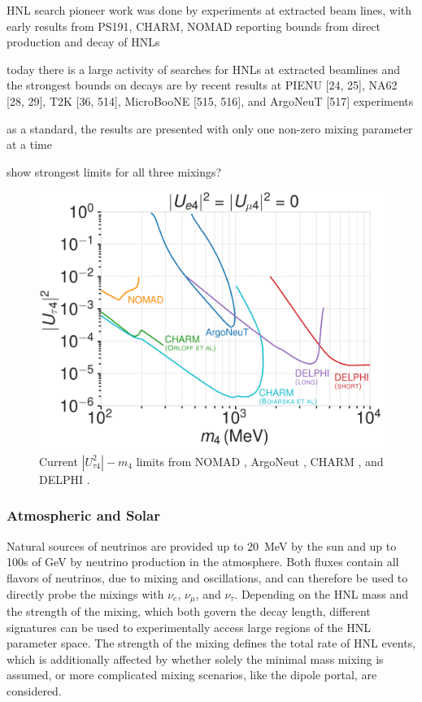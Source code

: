 HNL search pioneer work was done by experiments at extracted beam lines, with early results from PS191, CHARM, NOMAD reporting bounds from direct production and decay of HNLs

today there is a large activity of searches for HNLs at extracted beamlines and the strongest bounds on decays are by recent results at PIENU [24, 25], NA62 [28, 29], T2K [36, 514], MicroBooNE [515, 516], and ArgoNeuT [517] experiments

as a standard, the results are presented with only one non-zero mixing parameter at a time

show strongest limits for all three mixings?


\begin{figure}
  \includegraphics{figures/hnl_simulation/theory/UtauN_custom_plots_LF_grid_white.png}
  \caption[Current $|U_{\tau4}^2|-m_4$ limits]{Current $|U_{\tau4}^2|-m_4$ limits from NOMAD \cite{NOMAD:2001eyx}, ArgoNeut \cite{ArgoNeuT:2021clc}, CHARM \cite{Orloff:2002de, Boiarska:2021yho}, and DELPHI \cite{DELPHI:1996qcc}.}
\end{figure}


\subsubsection{Atmospheric and Solar}

Natural sources of neutrinos are provided up to \SI{20}{\mega\electronvolt} by the sun and up to 100s of \si{\giga\electronvolt} by neutrino production in the atmosphere. Both fluxes contain all flavors of neutrinos, due to mixing and oscillations, and can therefore be used to directly probe the mixings with $\nu_e$, $\nu_\mu$, and $\nu_\tau$. Depending on the HNL mass and the strength of the mixing, which both govern the decay length, different signatures can be used to experimentally access large regions of the HNL parameter space. The strength of the mixing defines the total rate of HNL events, which is additionally affected by whether solely the minimal mass mixing is assumed, or more complicated mixing scenarios, like the dipole portal, are considered.



